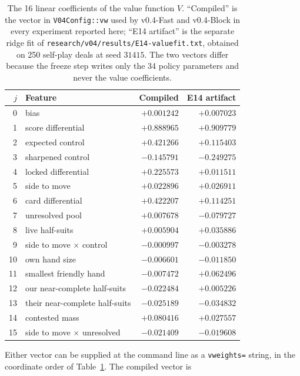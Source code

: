 \documentclass[11pt]{article}
\theoremstyle{definition}
\DeclareRobustCommand{\vfast}{\texorpdfstring{\mbox{v0.4-Fast}}{v0.4-Fast}}
\DeclareRobustCommand{\vblock}{\texorpdfstring{\mbox{v0.4-Block}}{v0.4-Block}}
\newcommand{\numParams}{34}
\newcommand{\numValueFeats}{16}
\begin{document}
\begin{table}[ht]
\centering
\caption{The \numValueFeats{} linear coefficients of the value function $V$.
``Compiled'' is the vector in \texttt{V04Config::vw} used by \vfast{} and
\vblock{} in every experiment reported here; ``E14 artifact'' is the separate
ridge fit of \texttt{research/v04/results/E14-valuefit.txt}, obtained on 250
self-play deals at seed $31415$. The two vectors differ because the freeze step
writes only the \numParams{} policy parameters and never the value coefficients.}
\label{tab:valuecoef}
\small
\begin{tabular}{rlrr}
\toprule
$j$ & Feature & Compiled & E14 artifact \\
\midrule
0  & bias                          & $+0.001242$ & $+0.007023$ \\
1  & score differential            & $+0.888965$ & $+0.909779$ \\
2  & expected control              & $+0.421266$ & $+0.115403$ \\
3  & sharpened control             & $-0.145791$ & $-0.249275$ \\
4  & locked differential           & $+0.225573$ & $+0.011511$ \\
5  & side to move                  & $+0.022896$ & $+0.026911$ \\
6  & card differential             & $+0.422207$ & $+0.114251$ \\
7  & unresolved pool               & $+0.007678$ & $-0.079727$ \\
8  & live half-suits               & $+0.005904$ & $+0.035886$ \\
9  & side to move $\times$ control & $-0.000997$ & $-0.003278$ \\
10 & own hand size                 & $-0.006601$ & $-0.011850$ \\
11 & smallest friendly hand        & $-0.007472$ & $+0.062496$ \\
12 & our near-complete half-suits  & $-0.022484$ & $+0.005226$ \\
13 & their near-complete half-suits& $-0.025189$ & $-0.034832$ \\
14 & contested mass                & $+0.080416$ & $+0.027557$ \\
15 & side to move $\times$ unresolved & $-0.021409$ & $-0.019608$ \\
\bottomrule
\end{tabular}
\end{table}

Either vector can be supplied at the command line as a \texttt{vweights=} string,
in the coordinate order of Table~\ref{tab:valuecoef}. The compiled vector is
\end{document}
